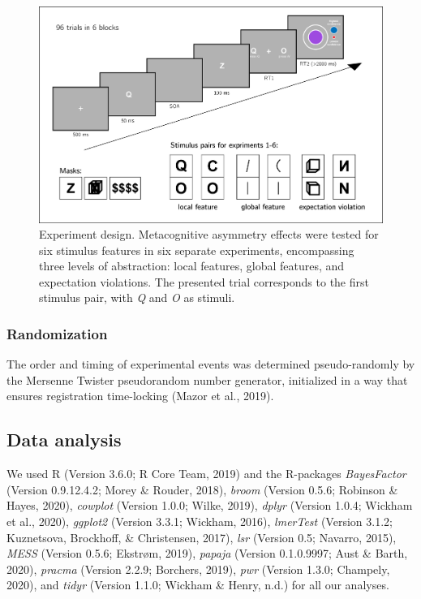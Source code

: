 \documentclass[12pt,twoside]{reedthesis}
\begin{document}
\begin{figure}
\includegraphics[width=1\linewidth]{figure/asymmetry/trial_structure} \caption[Design for Experiments 1-6]{Experiment design. Metacognitive asymmetry effects were tested for six stimulus features in six separate experiments, encompassing three levels of abstraction: local features, global features, and expectation violations. The presented trial corresponds to the first stimulus pair, with \emph{Q} and \emph{O} as stimuli.}\label{fig:asymmetry-trialstructure}
\end{figure}
\hypertarget{randomization-3}{%
\subsubsection{Randomization}\label{randomization-3}}

The order and timing of experimental events was determined pseudo-randomly by the Mersenne Twister pseudorandom number generator, initialized in a way that ensures registration time-locking (Mazor et al., 2019).

\hypertarget{data-analysis-1}{%
\subsection{Data analysis}\label{data-analysis-1}}

We used R (Version 3.6.0; R Core Team, 2019) and the R-packages \emph{BayesFactor} (Version 0.9.12.4.2; Morey \& Rouder, 2018), \emph{broom} (Version 0.5.6; Robinson \& Hayes, 2020), \emph{cowplot} (Version 1.0.0; Wilke, 2019), \emph{dplyr} (Version 1.0.4; Wickham et al., 2020), \emph{ggplot2} (Version 3.3.1; Wickham, 2016), \emph{lmerTest} (Version 3.1.2; Kuznetsova, Brockhoff, \& Christensen, 2017), \emph{lsr} (Version 0.5; Navarro, 2015), \emph{MESS} (Version 0.5.6; Ekstrøm, 2019), \emph{papaja} (Version 0.1.0.9997; Aust \& Barth, 2020), \emph{pracma} (Version 2.2.9; Borchers, 2019), \emph{pwr} (Version 1.3.0; Champely, 2020), and \emph{tidyr} (Version 1.1.0; Wickham \& Henry, n.d.) for all our analyses.
\end{document}
